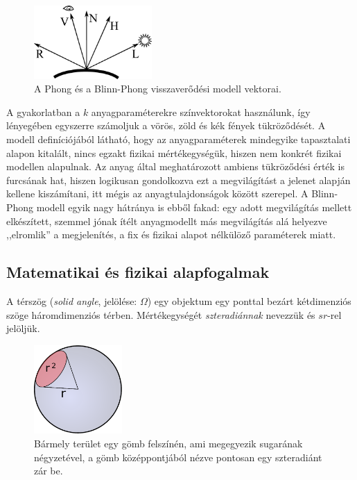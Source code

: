 \begin{figure}[!ht]
    \centering
    \includegraphics[width=0.4\textwidth]{images/blinn_vectors.eps}
    \caption{A Phong és a Blinn-Phong visszaverődési modell vektorai.}
\end{figure}

A gyakorlatban a \(k\) anyagparaméterekre színvektorokat használunk, így lényegében egyszerre számoljuk a vörös, zöld és kék fények tükröződését. A modell definíciójából látható, hogy az anyagparaméterek mindegyike tapasztalati alapon kitalált, nincs egzakt fizikai mértékegységük, hiszen nem konkrét fizikai modellen alapulnak. Az anyag által meghatározott ambiens tükröződési érték is furcsának hat, hiszen logikusan gondolkozva ezt a megvilágítást a jelenet alapján kellene kiszámítani, itt mégis az anyagtulajdonságok között szerepel. A Blinn-Phong modell egyik nagy hátránya is ebből fakad: egy adott megvilágítás mellett elkészített, szemmel jónak ítélt anyagmodellt más megvilágítás alá helyezve ,,elromlik'' a megjelenítés, a fix és fizikai alapot nélkülöző paraméterek miatt.

\subsection{Matematikai és fizikai alapfogalmak}
\label{subsec:matbase}

A térszög (\textit{solid angle}, jelölése: \(\Omega\)) egy objektum egy ponttal bezárt kétdimenziós szöge háromdimenziós térben. Mértékegységét \textit{szteradiánnak} nevezzük és \(sr\)-rel jelöljük.

\begin{figure}[!ht]
    \centering
    \includegraphics[width=0.3\textwidth]{images/steradian.eps}
    \caption{Bármely terület egy gömb felszínén, ami megegyezik sugarának négyzetével, a gömb középpontjából nézve pontosan egy szteradiánt zár be.}
\end{figure}

